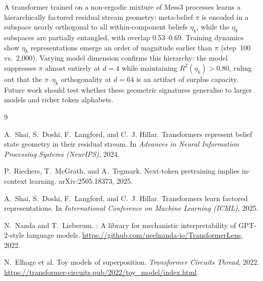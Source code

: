 \documentclass{article}
\begin{document}
A transformer trained on a non-ergodic mixture of Mess3 processes learns a
hierarchically factored residual stream geometry: meta-belief $\pi$ is encoded
in a subspace nearly orthogonal to all within-component beliefs $\eta_k$, while
the $\eta_k$ subspaces are partially entangled, with overlap 0.53--0.69.
Training dynamics show $\eta_k$ representations emerge an order of magnitude
earlier than $\pi$ (step~100 vs.\ 2{,}000).
Varying model dimension confirms this hierarchy: the model suppresses $\pi$
almost entirely at $d=4$ while maintaining $R^2(\eta_k) > 0.80$, ruling out
that the $\pi$--$\eta_k$ orthogonality at $d=64$ is an artifact of surplus capacity.
Future work should test whether these geometric signatures generalise to larger
models and richer token alphabets.

\FloatBarrier
\begin{thebibliography}{9}

A.~Shai, S.~Doshi, F.~Langford, and C.~J. Hillar.
\newblock Transformers represent belief state geometry in their residual stream.
\newblock In \emph{Advances in Neural Information Processing Systems (NeurIPS)}, 2024.

P.~Riechers, T.~McGrath, and A.~Tegmark.
\newblock Next-token pretraining implies in-context learning.
\newblock arXiv:2505.18373, 2025.

A.~Shai, S.~Doshi, F.~Langford, and C.~J. Hillar.
\newblock Transformers learn factored representations.
\newblock In \emph{International Conference on Machine Learning (ICML)}, 2025.

N.~Nanda and T.~Lieberum.
: A library for mechanistic interpretability of
  {GPT}-2-style language models.
\newblock \url{https://github.com/neelnanda-io/TransformerLens}, 2022.

N.~Elhage et al.
\newblock Toy models of superposition.
\newblock \emph{Transformer Circuits Thread}, 2022.
\newblock \url{https://transformer-circuits.pub/2022/toy_model/index.html}.


\end{thebibliography}
\end{document}
